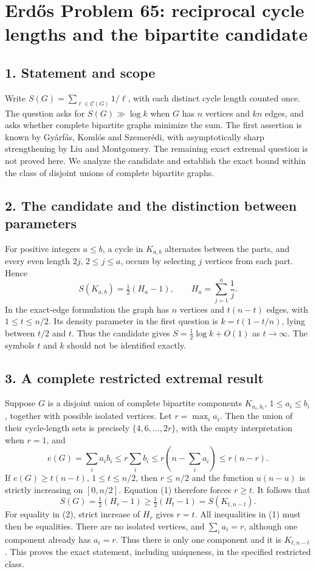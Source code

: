 \section*{Erd\H{o}s Problem 65: reciprocal cycle lengths and the bipartite candidate}
\subsection*{1. Statement and scope}
Write $S(G)=\sum_{\ell\in\mathcal C(G)}1/\ell$, with each distinct cycle length counted once. The question asks for $S(G)\gg\log k$ when $G$ has $n$ vertices and $kn$ edges, and asks whether complete bipartite graphs minimize the sum. The first assertion is known by Gy\'arf\'as, Koml\'os and Szemer\'edi, with asymptotically sharp strengthening by Liu and Montgomery. The remaining exact extremal question is not proved here. We analyze the candidate and establish the exact bound within the class of disjoint unions of complete bipartite graphs.

\subsection*{2. The candidate and the distinction between parameters}
For positive integers $a\le b$, a cycle in $K_{a,b}$ alternates between the parts, and every even length $2j$, $2\le j\le a$, occurs by selecting $j$ vertices from each part. Hence
\[
 S(K_{a,b})=\tfrac12(H_a-1),\qquad H_a=\sum_{j=1}^a\frac1j.
\]
In the exact-edge formulation the graph has $n$ vertices and $t(n-t)$ edges, with $1\le t\le n/2$. Its density parameter in the first question is $k=t(1-t/n)$, lying between $t/2$ and $t$. Thus the candidate gives $S=\tfrac12\log k+O(1)$ as $t\to\infty$. The symbols $t$ and $k$ should not be identified exactly.

\subsection*{3. A complete restricted extremal result}
Suppose $G$ is a disjoint union of complete bipartite components $K_{a_i,b_i}$, $1\le a_i\le b_i$, together with possible isolated vertices. Let $r=\max_i a_i$. Then the union of their cycle-length sets is precisely $\{4,6,\ldots,2r\}$, with the empty interpretation when $r=1$, and
\[
 e(G)=\sum_i a_i b_i\le r\sum_i b_i
 \le r\left(n-\sum_i a_i\right)\le r(n-r). \tag{1}
\]
If $e(G)\ge t(n-t)$, $1\le t\le n/2$, then $r\le n/2$ and the function $u(n-u)$ is strictly increasing on $[0,n/2]$. Equation (1) therefore forces $r\ge t$. It follows that
\[
 S(G)=\tfrac12(H_r-1)\ge\tfrac12(H_t-1)=S(K_{t,n-t}). \tag{2}
\]
For equality in (2), strict increase of $H_r$ gives $r=t$. All inequalities in (1) must then be equalities. There are no isolated vertices, and $\sum_i a_i=r$, although one component already has $a_i=r$. Thus there is only one component and it is $K_{t,n-t}$. This proves the exact statement, including uniqueness, in the specified restricted class.

